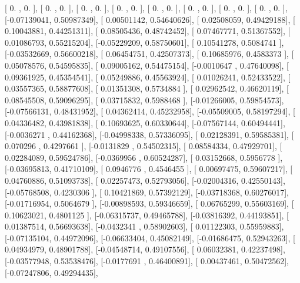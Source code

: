 \documentclass{article}
\begin{document}
       [ 0.        ,  0.        ],
       [ 0.        ,  0.        ],
       [ 0.        ,  0.        ],
       [ 0.        ,  0.        ],
       [ 0.        ,  0.        ],
       [ 0.        ,  0.        ],
       [ 0.        ,  0.        ],
       [ 0.        ,  0.        ],
       [-0.07139041,  0.50987349],
       [ 0.00501142,  0.54640626],
       [ 0.02508059,  0.49429188],
       [ 0.10043881,  0.44251311],
       [ 0.08505436,  0.48742452],
       [ 0.07467771,  0.51367552],
       [ 0.01086793,  0.55215204],
       [-0.05229209,  0.58750601],
       [ 0.10541278,  0.5084741 ],
       [-0.03532669,  0.56600218],
       [ 0.06454751,  0.42507373],
       [ 0.10685976,  0.4583373 ],
       [ 0.05078576,  0.54595835],
       [ 0.09005162,  0.54475154],
       [-0.0010647 ,  0.47640098],
       [ 0.09361925,  0.45354541],
       [ 0.05249886,  0.45563924],
       [ 0.01026241,  0.52433522],
       [ 0.03557365,  0.58877608],
       [ 0.01351308,  0.5734884 ],
       [ 0.02962542,  0.46620119],
       [ 0.08545508,  0.59096295],
       [ 0.03715832,  0.5988468 ],
       [-0.01266005,  0.59854573],
       [-0.07566131,  0.48431952],
       [ 0.04362414,  0.45232958],
       [-0.05509005,  0.58197294],
       [ 0.04336482,  0.43981838],
       [ 0.10693625,  0.60330644],
       [-0.07567144,  0.60494441],
       [-0.0036271 ,  0.44162368],
       [-0.04998338,  0.57336095],
       [ 0.02128391,  0.59585381],
       [ 0.070296  ,  0.4297661 ],
       [-0.0131829 ,  0.54502315],
       [ 0.08584334,  0.47929701],
       [ 0.02284089,  0.59524786],
       [-0.0369956 ,  0.60524287],
       [ 0.03152668,  0.5956778 ],
       [-0.03695813,  0.41710109],
       [ 0.0946776 ,  0.4546455 ],
       [ 0.00697475,  0.59607217],
       [ 0.04760886,  0.51093738],
       [ 0.02257473,  0.52793056],
       [-0.02004316,  0.42550143],
       [-0.05768508,  0.4230306 ],
       [ 0.10421869,  0.57392129],
       [-0.03718368,  0.60276017],
       [-0.01716954,  0.5064679 ],
       [-0.00898593,  0.59346659],
       [ 0.06765299,  0.55603169],
       [ 0.10623021,  0.4801125 ],
       [-0.06315737,  0.49465788],
       [-0.03816392,  0.44193851],
       [ 0.01387514,  0.56693638],
       [-0.0432341 ,  0.58902603],
       [ 0.01122303,  0.55959883],
       [-0.07135104,  0.44972096],
       [-0.06633404,  0.45082149],
       [-0.01686475,  0.52943263],
       [ 0.04934979,  0.48901788],
       [-0.04548714,  0.49107556],
       [ 0.06032381,  0.42237498],
       [-0.03577948,  0.53538476],
       [-0.0177691 ,  0.46400891],
       [ 0.00437461,  0.50472562],
       [-0.07247806,  0.49294435],
\end{document}
